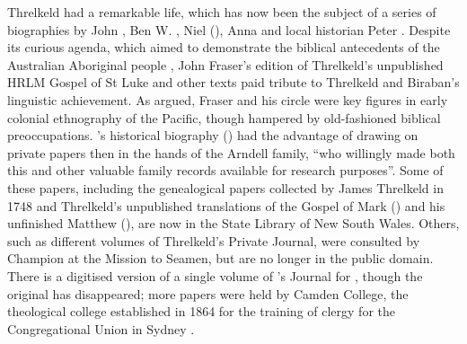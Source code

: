 Threlkeld had a remarkable life, which has now been the subject of a series of biographies by John \citet[xii--xv]{fraser_australian_1892}, Ben W. \citet{champion_lancelot_1939}, Niel \citeauthor{gunson_australian_1974a} (\citeyear{gunson_australian_1974a,gunson_australian_1974b, gunson_threlkeld_1967}), Anna \citet{johnston_paper_2011, johnston_blister_2006} and local historian Peter \citet{murray_mission_2018}. Despite its curious agenda, which aimed to demonstrate the biblical antecedents of the Australian Aboriginal people \citep{carey_babylon_2020}, John Fraser’s edition of Threlkeld’s unpublished HRLM Gospel of St Luke and other texts paid tribute to Threlkeld and Biraban’s linguistic achievement. As \citet{gunson_british_1994} argued, Fraser and his circle were key figures in early colonial ethnography of the Pacific, though hampered by old-fashioned biblical preoccupations. \citeauthor{champion_lancelot_1939}’s historical biography (\citeyear[280]{champion_lancelot_1939}) had the advantage of drawing on private papers then in the hands of the Arndell family, “who willingly made both this and other valuable family records available for research purposes”. Some of these papers, including the genealogical papers collected by James Threlkeld in 1748 \citep{threlkeld_family_genius_1767} and Threlkeld’s unpublished translations of the Gospel of Mark (\citeyear{threlkeld_gospel_1837}) and his unfinished Matthew (\citeyear{threlkeld_gospel_1837-1}), are now in the State Library of New South Wales. Others, such as different volumes of Threlkeld’s Private Journal, were consulted by Champion at the Mission to Seamen, but are no longer in the public domain. There is a digitised version of a single volume of \citeauthor{threlkeld_journal_1828-1846}’s Journal for \citeyear{threlkeld_journal_1828-1846}, though the original has disappeared; more papers were held by Camden College, the theological college established in 1864 for the training of clergy for the Congregational Union in Sydney \citep{gunson_threlkeld_1967}.

